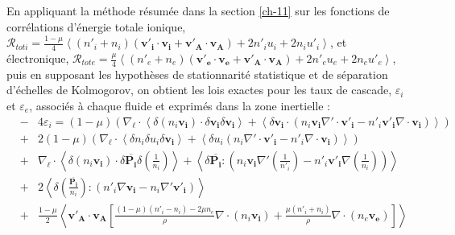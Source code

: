 En appliquant la méthode résumée dans la section \ref{ch-11} sur les fonctions de corrélations d'énergie totale ionique, $\mathcal{R}_{tot i} = \frac{1-\mu}{4} \left<  (n'_i + n_i) (\boldsymbol{v'_i} \cdot \boldsymbol{v_i} + \boldsymbol{v'_A} \cdot \boldsymbol{v_A}) + 2 n'_i u_i + 2 n_i u'_i \right>$, et électronique,  $ \mathcal{R}_{tot e} = \frac{\mu}{4} \left<  (n'_e + n_e) (\boldsymbol{v'_e} \cdot \boldsymbol{v_e} + \boldsymbol{v'_A} \cdot \boldsymbol{v_A}) + 2 n'_e u_e + 2 n_e u'_e \right> $, puis en supposant les hypothèses de stationnarité statistique et de séparation d'échelles de Kolmogorov, on obtient les lois exactes pour les taux de cascade, $\varepsilon_i$ et $\varepsilon_e$, associés à chaque fluide et exprimés dans la zone inertielle  :
\begin{eqnarray}
  \label{eq:turb_bi_Ri} &-&4 \varepsilon_i = \left(1-\mu\right)\left( \nabla_{\boldsymbol{\ell}} \cdot\left<  \delta \left(n_i \boldsymbol{v_i}\right) \cdot \delta \boldsymbol{v_i}\delta \boldsymbol{v_i} \right> +\left<\delta \boldsymbol{v_i}\cdot \left(n_i \boldsymbol{v_i}   \nabla' \cdot \boldsymbol{v'_i}- n'_i \boldsymbol{v'_i} \nabla \cdot \boldsymbol{v_i}\right)\right>\right)  \nonumber\\ %
  &+& 2  \left(1-\mu\right) \left(\nabla_{\boldsymbol{\ell}} \cdot\left<  \delta n_i  \delta u_i\delta \boldsymbol{v_i} \right> +\left<\delta u_i  \left(n_i \nabla' \cdot \boldsymbol{v'_i}- n'_i \nabla \cdot \boldsymbol{v_i}\right)\right> \right) \nonumber\\ %
  &+& \nabla_{\boldsymbol{\ell}} \cdot\left<  \delta \left(n_i \boldsymbol{v_i}\right) \cdot \delta \overline{\boldsymbol{P_i}} \delta \left(\frac{1}{n_i}\right)\right> + \left<\delta \overline{\boldsymbol{P_i}} : \left(n_i \boldsymbol{v_i}  \nabla' \left(\frac{1}{n'_i}\right) - n'_i \boldsymbol{v'_i} \nabla \left(\frac{1}{n_i}\right)\right)\right> \nonumber \\ %
  &+& 2 \left<\delta \left(\frac{\overline{\boldsymbol{P_i}}}{n_i}\right) : \left(n'_i \nabla\boldsymbol{v_i} - n_i \nabla' \boldsymbol{v'_i}\right) \right> \nonumber \\ %
  &+&\frac{1-\mu}{2} \left<  \boldsymbol{v'_A} \cdot \boldsymbol{v_{A}}  \left[ \frac{\left(1-\mu\right)\left(n'_i - n_i\right) -2 \mu n_e }{\rho}\nabla \cdot \left(n_i \boldsymbol{v_i}\right)+  \frac{\mu \left(n'_i + n_i\right)}{\rho}  \nabla \cdot \left(n_e \boldsymbol{v_e}\right)  \right] \right> \nonumber\\ %

\end{eqnarray}
